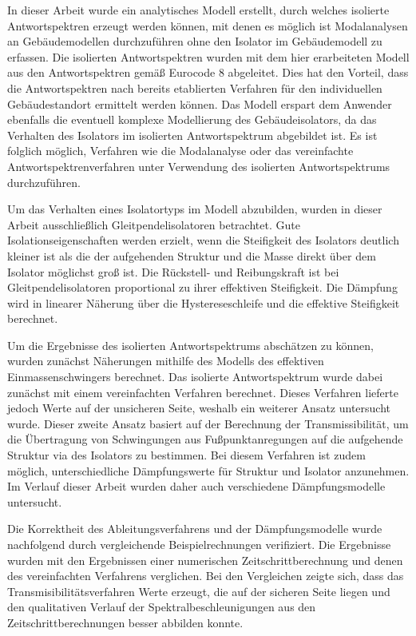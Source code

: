 
In dieser Arbeit wurde ein analytisches Modell erstellt, durch welches isolierte Antwortspektren erzeugt werden können, mit denen es möglich ist Modalanalysen an Gebäudemodellen durchzuführen ohne den Isolator im Gebäudemodell zu erfassen.
Die isolierten Antwortspektren wurden mit dem hier erarbeiteten Modell aus den Antwortspektren gemäß Eurocode 8 abgeleitet.
Dies hat den Vorteil, dass die Antwortspektren nach bereits etablierten Verfahren für den individuellen Gebäudestandort ermittelt werden können.
Das Modell erspart dem Anwender ebenfalls die eventuell komplexe Modellierung des Gebäudeisolators, da das Verhalten des Isolators im isolierten Antwortspektrum abgebildet ist.
Es ist folglich möglich, Verfahren wie die Modalanalyse oder das vereinfachte Antwortspektrenverfahren unter Verwendung des isolierten Antwortspektrums durchzuführen.

Um das Verhalten eines Isolatortyps im Modell abzubilden, wurden in dieser Arbeit ausschließlich Gleitpendelisolatoren betrachtet.
Gute Isolationseigenschaften werden erzielt, wenn die Steifigkeit des Isolators deutlich kleiner ist als die der aufgehenden Struktur und die Masse direkt über dem Isolator möglichst groß ist.
Die Rückstell- und Reibungskraft ist bei Gleitpendelisolatoren proportional zu ihrer effektiven Steifigkeit.
Die Dämpfung wird in linearer Näherung über die Hystereseschleife und die effektive Steifigkeit berechnet.

Um die Ergebnisse des isolierten Antwortspektrums abschätzen zu können, wurden zunächst Näherungen mithilfe des Modells des effektiven Einmassenschwingers berechnet.
Das isolierte Antwortspektrum wurde dabei zunächst mit einem vereinfachten Verfahren berechnet. Dieses Verfahren lieferte jedoch Werte auf der unsicheren Seite, weshalb ein weiterer Ansatz untersucht wurde.
Dieser zweite Ansatz basiert auf der Berechnung der Transmissibilität, um die Übertragung von Schwingungen aus Fußpunktanregungen auf die aufgehende Struktur via des Isolators zu bestimmen.
Bei diesem  Verfahren ist zudem möglich, unterschiedliche Dämpfungswerte für Struktur und Isolator anzunehmen.
Im Verlauf dieser Arbeit wurden daher auch verschiedene Dämpfungsmodelle untersucht.

Die Korrektheit des Ableitungsverfahrens und der Dämpfungsmodelle wurde nachfolgend durch vergleichende Beispielrechnungen verifiziert.
Die Ergebnisse wurden mit den Ergebnissen einer numerischen Zeitschrittberechnung und denen des vereinfachten Verfahrens verglichen.
Bei den Vergleichen zeigte sich, dass das Transmisibilitätsverfahren Werte erzeugt, die auf der sicheren Seite liegen und den qualitativen Verlauf der Spektralbeschleunigungen aus den Zeitschrittberechnungen besser abbilden konnte.

